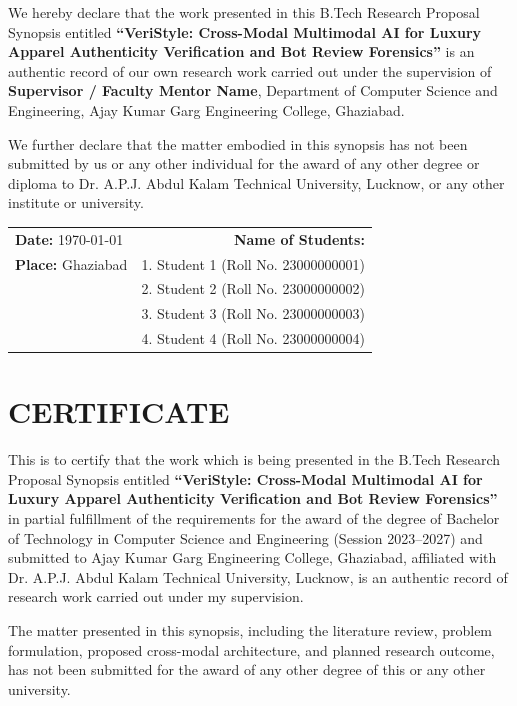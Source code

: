 \documentclass[a4paper,12pt]{report}
\newcommand{\reporttitle}{VeriStyle: Cross-Modal Multimodal AI for Luxury Apparel Authenticity Verification and Bot Review Forensics}
\newcommand{\session}{2023--2027}
\newcommand{\mentor}{Supervisor / Faculty Mentor Name}
\newcommand{\submissiondate}{\today}
\begin{document}
We hereby declare that the work presented in this B.Tech Research Proposal Synopsis entitled \textbf{``\reporttitle''} is an authentic record of our own research work carried out under the supervision of \textbf{\mentor}, Department of Computer Science and Engineering, Ajay Kumar Garg Engineering College, Ghaziabad.

We further declare that the matter embodied in this synopsis has not been submitted by us or any other individual for the award of any other degree or diploma to Dr. A.P.J. Abdul Kalam Technical University, Lucknow, or any other institute or university.

\vspace{3cm}

\noindent
\begin{tabularx}{\textwidth}{X r}
\textbf{Date:} \submissiondate & \textbf{Name of Students:}\\[0.2cm]
\textbf{Place:} Ghaziabad & 1. Student 1 (Roll No. 23000000001)\\[0.1cm]
& 2. Student 2 (Roll No. 23000000002)\\[0.1cm]
& 3. Student 3 (Roll No. 23000000003)\\[0.1cm]
& 4. Student 4 (Roll No. 23000000004)\\
\end{tabularx}

\newpage

\chapter*{CERTIFICATE}

This is to certify that the work which is being presented in the B.Tech Research Proposal Synopsis entitled \textbf{``\reporttitle''} in partial fulfillment of the requirements for the award of the degree of Bachelor of Technology in Computer Science and Engineering (Session \session) and submitted to Ajay Kumar Garg Engineering College, Ghaziabad, affiliated with Dr. A.P.J. Abdul Kalam Technical University, Lucknow, is an authentic record of research work carried out under my supervision.

The matter presented in this synopsis, including the literature review, problem formulation, proposed cross-modal architecture, and planned research outcome, has not been submitted for the award of any other degree of this or any other university.

\vspace{3.5cm}
\end{document}
